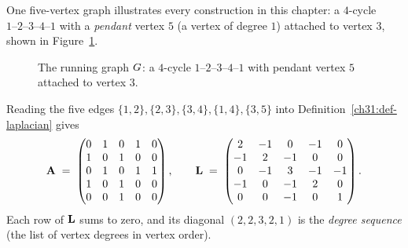 \begin{example}\label{ch31:ex-running}
One five-vertex graph illustrates every construction in this chapter: a $4$-cycle $1\text{--}2\text{--}3\text{--}4\text{--}1$ with a \emph{pendant} vertex $5$ (a vertex of degree $1$) attached to vertex $3$, shown in Figure~\ref{ch31:fig-running}.

\begin{figure}[htbp]
\centering
{}
\caption{The running graph $G$: a $4$-cycle $1\text{--}2\text{--}3\text{--}4\text{--}1$ with pendant vertex $5$ attached to vertex $3$.}
\label{ch31:fig-running}
\end{figure}

Reading the five edges $\{1,2\},\{2,3\},\{3,4\},\{1,4\},\{3,5\}$ into Definition~\ref{ch31:def-laplacian} gives
\[
  \mathbf{A} \;=\;
  \begin{pmatrix}
    0 & 1 & 0 & 1 & 0\\
    1 & 0 & 1 & 0 & 0\\
    0 & 1 & 0 & 1 & 1\\
    1 & 0 & 1 & 0 & 0\\
    0 & 0 & 1 & 0 & 0
  \end{pmatrix},
  \qquad
  \mathbf{L} \;=\;
  \begin{pmatrix}
     2 & -1 &  0 & -1 &  0\\
    -1 &  2 & -1 &  0 &  0\\
     0 & -1 &  3 & -1 & -1\\
    -1 &  0 & -1 &  2 &  0\\
     0 &  0 & -1 &  0 &  1
  \end{pmatrix}.
\]
Each row of $\mathbf{L}$ sums to zero, and its diagonal $(2,2,3,2,1)$ is the \emph{degree sequence} (the list of vertex degrees in vertex order).
\end{example}

